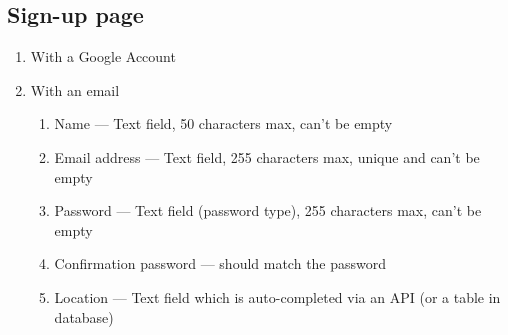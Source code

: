 \documentclass[conference]{IEEEtran}
\begin{document}
\subsection{Sign-up page}

\begin{enumerate}
    \item With a Google Account
    \item With an email
    \begin{enumerate}
        \item Name --- Text field, 50 characters max, can’t be empty
        \item Email address --- Text field, 255 characters max, unique and can’t be empty
        \item Password --- Text field (password type), 255 characters max, can’t be empty
        \item Confirmation password --- should match the password
        \item Location --- Text field which is auto-completed via an API (or a table in database)
    \end{enumerate}
\end{enumerate}
\end{document}
